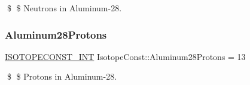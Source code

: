 \$ \$ Neutrons in Aluminum-\/28. \mbox{\label{group___isotope_const-_aluminum-_al28_ga48d040d5ff2c64b52a63915645c54b14}} 
\subsubsection{\texorpdfstring{Aluminum28\+Protons}{Aluminum28Protons}}
{\footnotesize\ttfamily \mbox{\hyperlink{group___isotope_const-_macros_ga5f18360b3e99483a35c32d789e62621c}{I\+S\+O\+T\+O\+P\+E\+C\+O\+N\+S\+T\+\_\+\+I\+NT}} Isotope\+Const\+::\+Aluminum28\+Protons = 13}

\$ \$ Protons in Aluminum-\/28. 